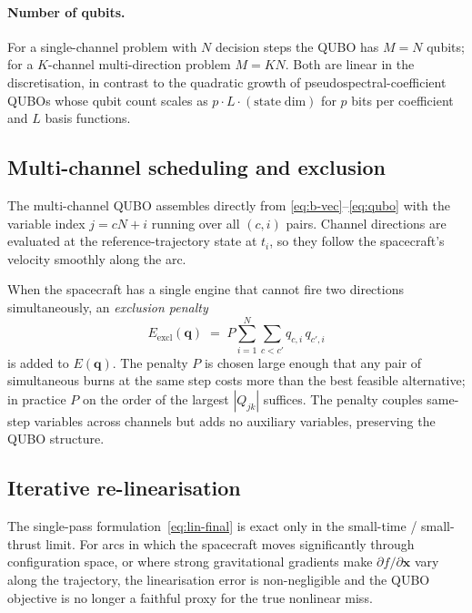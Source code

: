 \documentclass[11pt,a4paper]{article}
\theoremstyle{plain}
\newcommand{\bvec}[1]{\bm{#1}}
\newcommand{\xvec}{\bvec{x}}
\newcommand{\qvec}{\bvec{q}}
\begin{document}
\paragraph{Number of qubits.} For a single-channel problem with
$N$ decision steps the QUBO has $M = N$ qubits; for a
$K$-channel multi-direction problem $M = K N$. Both are linear
in the discretisation, in contrast to the quadratic growth of
pseudospectral-coefficient QUBOs whose qubit count scales as
$p \cdot L \cdot \mathrm{(state\;dim)}$ for $p$ bits per
coefficient and $L$ basis functions.

\subsection{Multi-channel scheduling and exclusion}\label{sec:method-multi}

The multi-channel QUBO assembles directly from
\eqref{eq:b-vec}--\eqref{eq:qubo} with the variable index
$j = cN+i$ running over all $(c, i)$ pairs. Channel directions
are evaluated at the reference-trajectory state at $t_i$, so they
follow the spacecraft's velocity smoothly along the arc.

When the spacecraft has a single engine that cannot fire two
directions simultaneously, an \emph{exclusion penalty}
\begin{equation}\label{eq:exclusion}
  E_\mathrm{excl}(\qvec)
  \;=\; P \sum_{i=1}^{N} \sum_{c < c'} q_{c,i}\, q_{c',i}
\end{equation}
is added to $E(\qvec)$. The penalty $P$ is chosen large enough
that any pair of simultaneous burns at the same step costs more
than the best feasible alternative; in practice $P$ on the order
of the largest $|Q_{jk}|$ suffices. The penalty couples
same-step variables across channels but adds no auxiliary
variables, preserving the QUBO structure.

\subsection{Iterative re-linearisation}\label{sec:method-iterative}

The single-pass formulation~\eqref{eq:lin-final} is exact only in
the small-time / small-thrust limit. For arcs in which the
spacecraft moves significantly through configuration space, or
where strong gravitational gradients make
$\partial f/\partial \xvec$ vary along the trajectory, the
linearisation error is non-negligible and the QUBO objective is
no longer a faithful proxy for the true nonlinear miss.
\end{document}
